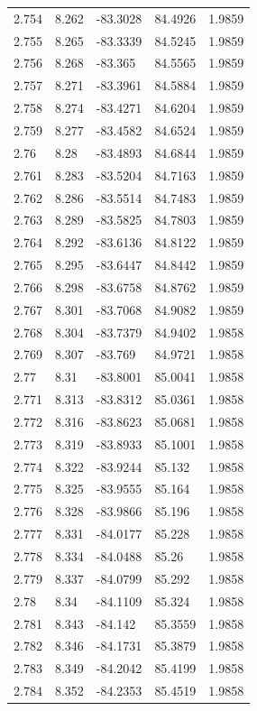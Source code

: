 \begin{tabular}{lllll}
2.754 & 8.262 & -83.3028 & 84.4926 & 1.9859 \\
2.755 & 8.265 & -83.3339 & 84.5245 & 1.9859 \\
2.756 & 8.268 & -83.365 & 84.5565 & 1.9859 \\
2.757 & 8.271 & -83.3961 & 84.5884 & 1.9859 \\
2.758 & 8.274 & -83.4271 & 84.6204 & 1.9859 \\
2.759 & 8.277 & -83.4582 & 84.6524 & 1.9859 \\
2.76 & 8.28 & -83.4893 & 84.6844 & 1.9859 \\
2.761 & 8.283 & -83.5204 & 84.7163 & 1.9859 \\
2.762 & 8.286 & -83.5514 & 84.7483 & 1.9859 \\
2.763 & 8.289 & -83.5825 & 84.7803 & 1.9859 \\
2.764 & 8.292 & -83.6136 & 84.8122 & 1.9859 \\
2.765 & 8.295 & -83.6447 & 84.8442 & 1.9859 \\
2.766 & 8.298 & -83.6758 & 84.8762 & 1.9859 \\
2.767 & 8.301 & -83.7068 & 84.9082 & 1.9859 \\
2.768 & 8.304 & -83.7379 & 84.9402 & 1.9858 \\
2.769 & 8.307 & -83.769 & 84.9721 & 1.9858 \\
2.77 & 8.31 & -83.8001 & 85.0041 & 1.9858 \\
2.771 & 8.313 & -83.8312 & 85.0361 & 1.9858 \\
2.772 & 8.316 & -83.8623 & 85.0681 & 1.9858 \\
2.773 & 8.319 & -83.8933 & 85.1001 & 1.9858 \\
2.774 & 8.322 & -83.9244 & 85.132 & 1.9858 \\
2.775 & 8.325 & -83.9555 & 85.164 & 1.9858 \\
2.776 & 8.328 & -83.9866 & 85.196 & 1.9858 \\
2.777 & 8.331 & -84.0177 & 85.228 & 1.9858 \\
2.778 & 8.334 & -84.0488 & 85.26 & 1.9858 \\
2.779 & 8.337 & -84.0799 & 85.292 & 1.9858 \\
2.78 & 8.34 & -84.1109 & 85.324 & 1.9858 \\
2.781 & 8.343 & -84.142 & 85.3559 & 1.9858 \\
2.782 & 8.346 & -84.1731 & 85.3879 & 1.9858 \\
2.783 & 8.349 & -84.2042 & 85.4199 & 1.9858 \\
2.784 & 8.352 & -84.2353 & 85.4519 & 1.9858 \\

\end{tabular}
